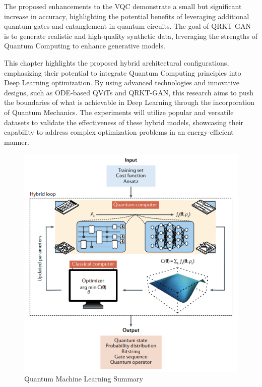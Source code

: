 \documentclass[12pt,a4paper]{report}
\begin{document}
The proposed enhancements to the VQC demonstrate a small but significant increase in accuracy, highlighting the potential benefits of leveraging additional quantum gates and entanglement in quantum circuits. The goal of QRKT-GAN is to generate realistic and high-quality synthetic data, leveraging the strengths of Quantum Computing to enhance generative models.

This chapter highlights the proposed hybrid architectural configurations, emphasizing their potential to integrate Quantum Computing principles into Deep Learning optimization. By using advanced technologies and innovative designs, such as ODE-based QViTs and QRKT-GAN, this research aims to push the boundaries of what is achievable in Deep Learning through the incorporation of Quantum Mechanics. The experiments will utilize popular and versatile datasets to validate the effectiveness of these hybrid models, showcasing their capability to address complex optimization problems in an energy-efficient manner.

\begin{figure}[th]
  \centering
  \includegraphics[scale=0.675]{./pics/image.png}
  \caption[Quantum Machine Learning Summary]{Quantum Machine Learning Summary~\cite{cerezo2021variational}}
  \label{fig:p13}
\end{figure}
\end{document}
